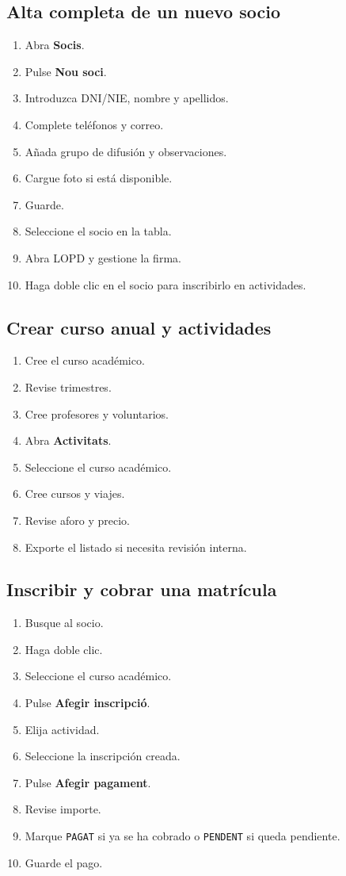 \documentclass[12pt]{article}
\newcommand{\boton}[1]{\textbf{#1}}
\newcommand{\menu}[1]{\textbf{#1}}
\newcommand{\estado}[1]{\texttt{#1}}
\begin{document}
\subsection{Alta completa de un nuevo socio}
\begin{enumerate}
  \item Abra \menu{Socis}.
  \item Pulse \boton{Nou soci}.
  \item Introduzca DNI/NIE, nombre y apellidos.
  \item Complete teléfonos y correo.
  \item Añada grupo de difusión y observaciones.
  \item Cargue foto si está disponible.
  \item Guarde.
  \item Seleccione el socio en la tabla.
  \item Abra LOPD y gestione la firma.
  \item Haga doble clic en el socio para inscribirlo en actividades.
\end{enumerate}

\subsection{Crear curso anual y actividades}
\begin{enumerate}
  \item Cree el curso académico.
  \item Revise trimestres.
  \item Cree profesores y voluntarios.
  \item Abra \menu{Activitats}.
  \item Seleccione el curso académico.
  \item Cree cursos y viajes.
  \item Revise aforo y precio.
  \item Exporte el listado si necesita revisión interna.
\end{enumerate}

\subsection{Inscribir y cobrar una matrícula}
\begin{enumerate}
  \item Busque al socio.
  \item Haga doble clic.
  \item Seleccione el curso académico.
  \item Pulse \boton{Afegir inscripció}.
  \item Elija actividad.
  \item Seleccione la inscripción creada.
  \item Pulse \boton{Afegir pagament}.
  \item Revise importe.
  \item Marque \estado{PAGAT} si ya se ha cobrado o \estado{PENDENT} si queda pendiente.
  \item Guarde el pago.
\end{enumerate}
\end{document}
